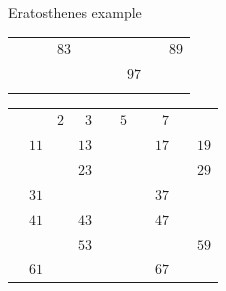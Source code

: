 \documentclass{beamer}
\begin{document}
\begin{frame}[plain]{Eratosthenes example}
{\begin{tabular}{r r r r r r r r r r}
			                   &                    &                    & \color{black} $83$ &                    &                    &                    &                    &                    & \color{black} $89$\\
			                   &                    &                    &                    &                    &                    &                    & \color{black} $97$ &                    &                   \\
			\phantom{$888$} & \phantom{$888$} & \phantom{$888$} & \phantom{$888$} & \phantom{$888$} & \phantom{$888$} & \phantom{$888$} & \phantom{$888$} & \phantom{$888$} & \phantom{$888$}
        \end{tabular}
	}
	 {
		\begin{tabular}{r r r r r r r r r r}
			                   &                    & \color{black}  $2$ & \color{black}  $3$ &                    & \color{black}  $5$ &                    & \color{black}  $7$ &                    &                   \\
			                   & \color{black} $11$ &                    & \color{black} $13$ &                    &                    &                    & \color{black} $17$ &                    & \color{black} $19$\\
			                   &                    &                    & \color{black} $23$ &                    &                    &                    &                    &                    & \color{black} $29$\\
			                   & \color{black} $31$ &                    &                    &                    &                    &                    & \color{black} $37$ &                    &                   \\
			                   & \color{black} $41$ &                    & \color{black} $43$ &                    &                    &                    & \color{black} $47$ &                    &                   \\
			                   &                    &                    & \color{black} $53$ &                    &                    &                    &                    &                    & \color{black} $59$\\
			                   & \color{black} $61$ &                    &                    &                    &                    &                    & \color{black} $67$ &                    &                   \\

\end{tabular}}
\end{frame}
\end{document}
